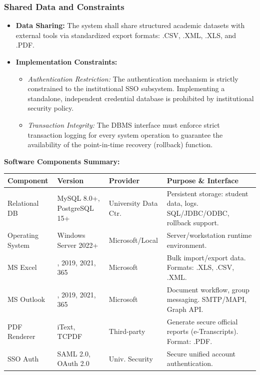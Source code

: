 \documentclass[11pt, a4paper]{article}
\renewcommand{\arraystretch}{1.3} %
\begin{document}
\subsubsection{Shared Data and Constraints}
\begin{itemize}
    \item \textbf{Data Sharing:} The system shall share structured academic datasets with external tools via standardized export formats: .CSV, .XML, .XLS, and .PDF.
    \item \textbf{Implementation Constraints:}
    \begin{itemize}
        \item \textit{Authentication Restriction:} The authentication mechanism is strictly constrained to the institutional SSO subsystem. Implementing a standalone, independent credential database is prohibited by institutional security policy.
        \item \textit{Transaction Integrity:} The DBMS interface must enforce strict transaction logging for every system operation to guarantee the availability of the point-in-time recovery (rollback) function.
    \end{itemize}
\end{itemize}

\textbf{Software Components Summary:}
\begin{table}[H]
\centering
\small
\setlength{\arraystretch}{0.9}
\begin{tabularx}{\textwidth}{>{\raggedright\arraybackslash}p{2.4cm} >{\raggedright\arraybackslash}p{2.4cm} >{\raggedright\arraybackslash}p{2.4cm} >{\raggedright\arraybackslash}X}
\toprule
\textbf{Component} & \textbf{Version} & \textbf{Provider} & \textbf{Purpose \& Interface} \\
\midrule
Relational DB & MySQL 8.0+, PostgreSQL 15+ & University Data Ctr. & Persistent storage: student data, logs. SQL/JDBC/ODBC, rollback support. \\
\midrule
Operating System & Windows Server 2022+ & Microsoft/Local & Server/workstation runtime environment. \\
\midrule
MS Excel & 2016, 2019, 2021, 365 & Microsoft & Bulk import/export data. Formats: .XLS, .CSV, .XML. \\
\midrule
MS Outlook & 2016, 2019, 2021, 365 & Microsoft & Document workflow, group messaging. SMTP/MAPI, Graph API. \\
\midrule
PDF Renderer & iText, TCPDF & Third-party & Generate secure official reports (e-Transcripts). Format: .PDF. \\
\midrule
SSO Auth & SAML 2.0, OAuth 2.0 & Univ. Security & Secure unified account authentication. \\
\bottomrule
\end{tabularx}
\normalsize
\setlength{\arraystretch}{1.3}
\end{table}
\end{document}
